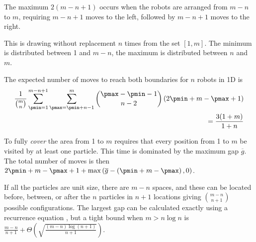 The maximum $2(m-n+1)$ occurs when the robots are arranged from $m-n$ to $m$, requiring $m-n+1$ moves to the left, followed by $m-n+1$ moves to the right.

This is drawing without replacement $n$ times from the set $[1, m]$.  The minimum is distributed between 1 and $m-n$, the maximum is distributed between $n$ and $m$.

The expected number of moves to reach both boundaries for $n$ robots in 1D is 
\begin{align}
\frac{1}{{m \choose n}} \sum_{\pmin = 1}^{m-n+1}  \sum_{\pmax = \pmin +n-1}^{m}   {\pmax -\pmin-1 \choose n-2} \left( 2 \pmin +m- \pmax +1\right)  \nonumber \\
= \frac{3(1+m)}{1+n}\label{eq:expectedMoveskrobots1D}
\end{align}

To fully \emph{cover} the area from 1 to $m$ requires that every position from 1 to $m$ be visited by at least one particle.  This time is dominated by the maximum gap $\overline{g}$. The total number of moves is then $ 2 \pmin +m- \pmax +1 + \max \left( \overline{g} - \left(\pmin + m-\pmax \right),0 \right)$.


 If all the particles are unit size, there are $m-n$ spaces, and these can be located before, between, or after the $n$ particles in $n+1$ locations giving ${m-n \choose n+1}$ possible configurations. The largest gap can be calculated exactly using a recurrence equation \citep{reviriego2011expected}, but a tight bound when
$m>n \log{n}$ is $\frac{m-n}{n+1} + \Theta \left( \sqrt{\frac{ (m-n)\log(n+1)}{n+1}} \right)$\citep{Raab1998}. 




